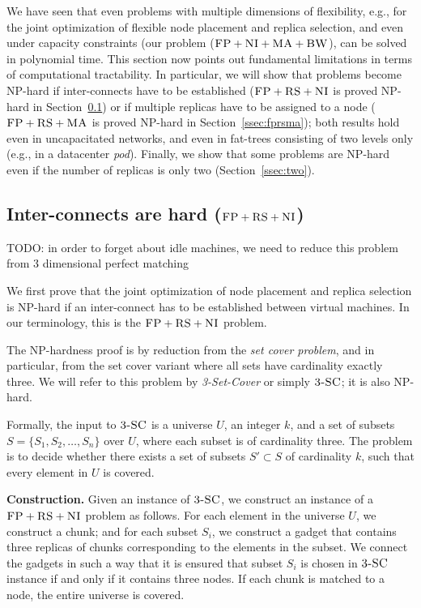 We have seen that even problems with multiple dimensions of
flexibility, e.g., for the joint optimization of
flexible node placement
and replica selection, and even under capacity constraints (our problem
($\textsc{FP}+\textsc{NI}+\textsc{MA}+\textsc{BW}$), can be solved in polynomial time.
This section now points out fundamental
limitations in terms of computational tractability. In particular,
we will show that problems become NP-hard if
inter-connects have to be established ($\textsc{FP}+\textsc{RS}+\textsc{NI}$ is proved
NP-hard in Section~\ref{ssec:fprscc}) or if multiple replicas
have to be assigned to a node ($\textsc{FP}+\textsc{RS}+\textsc{MA}$ is proved
NP-hard in Section~\ref{ssec:fprsma}); both results hold
even in uncapacitated networks, and even in fat-trees consisting
of two levels only (e.g., in a datacenter \emph{pod}). Finally, we show that
some problems are NP-hard even if the number of replicas is only two
(Section~\ref{ssec:two}).

\subsection{Inter-connects are hard ($\textsc{FP}+\textsc{RS}+\textsc{NI}$)}\label{ssec:fprscc}

TODO: in order to forget about idle machines, we need to reduce this problem from 3 dimensional perfect matching

We first prove that the joint optimization of node placement and replica selection
is NP-hard if an inter-connect has to be established between virtual machines.
In our terminology, this is the  $\textsc{FP}+\textsc{RS}+\textsc{NI}$ problem.

The NP-hardness proof is by reduction from the \emph{set cover problem},
and in particular, from the set cover variant where all
sets have cardinality exactly three. We will
refer to this problem by \emph{3-Set-Cover} or simply $\textsc{3-SC}$;
it is also NP-hard.~\cite{3SC-hard}


Formally, the input to $\textsc{3-SC}$ is a universe $U$, an integer $k$,
and a set of subsets
$S = \{ S_1, S_2, \ldots, S_n \}$ over $U$, where each subset is of
cardinality three. The problem is to decide whether there
exists a set of subsets $S' \subset S$ of cardinality $k$, such that
every element in $U$ is covered.

\textbf{Construction.}
Given an instance of $\textsc{3-SC}$, we construct an instance of a
$\textsc{FP}+\textsc{RS}+\textsc{NI}$ problem as follows. For each element
in the universe $U$, we construct a chunk; and for each
subset $S_i$, we construct a gadget that contains
three replicas of chunks corresponding to the elements in the subset.
We connect the gadgets in such a way that it is ensured
that subset $S_i$ is
chosen in $\textsc{3-SC}$ instance if and only if it contains three nodes.
If each chunk is matched to a node, the entire universe
is covered.


